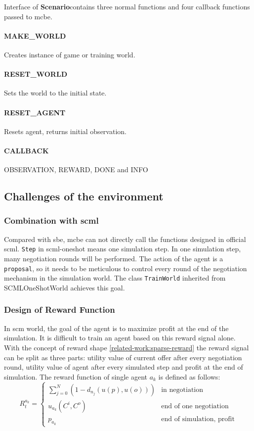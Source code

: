 Interface of \textbf{Scenario}contains three normal functions and four callback functions passed to \gls{mcbe}.

\paragraph{MAKE\_WORLD} Creates instance of game or training world.
\paragraph{RESET\_WORLD} Sets the world to the initial state.
\paragraph{RESET\_AGENT} Resets agent, returns initial observation.
\paragraph{CALLBACK} OBSERVATION, REWARD, DONE and INFO

\subsection{Challenges of the environment}
\subsubsection{Combination with \gls{scml}}
Compared with \gls{sbe}, \gls{mcbe} can not directly call the functions designed in official \gls{scml}. \texttt{Step} in \gls{scml-oneshot} means one simulation step. In one simulation step, many negotiation rounds will be performed. The action of the agent is a \texttt{proposal}, so it needs to be meticulous to control every round of the negotiation mechanism in the simulation world. The class \texttt{TrainWorld} inherited from SCMLOneShotWorld achieves this goal.
\subsubsection{Design of Reward Function} \label{analysis:scml:design-of-reward-function}
In \gls{scm} world, the goal of the agent is to maximize profit at the end of the simulation. It is difficult to train an agent based on this reward signal alone. With the concept of reward shape \ref{related-work:sparse-reward} the reward signal can be split as three parts: utility value of current offer after every negotiation round, utility value of agent after every simulated step and profit at the end of simulation. The reward function of single agent $a_k$ is defined as follows:
\begin{equation}
R_{t}^{a_k}=\left\{\begin{array}{ll}
\sum_{j=0}^{N}\left({1-d_{n_j}(u(p), u(o))}\right) & \text {in negotiation}\\
u_{a_k}\left(C^{i}, C^{o}\right) & \text {end of one negotiation} \\
p_{a_k} & \text{end of simulation, profit}
\end{array}\right.
\end{equation}

